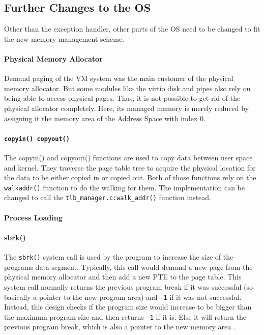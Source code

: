 \subsection{Further Changes to the OS}
Other than the exception handler, other parts of the OS need to be changed to fit the new memory management scheme.

\paragraph{Physical Memory Allocator} %
Demand paging of the VM system was the main customer of the physical memory allocator.
But some modules like the virtio disk and pipes also rely on being able to access physical pages. Thus, it is not
possible to get rid of the physical allocator completely.
Here, its managed memory is merely reduced by assigning it the memory area of the Address Space with index 0.

\paragraph{\texttt{copyin() copyout()}} The copyin() and copyout() functions are used to copy data between
user space and kernel. They traverse the page table tree to acquire the physical location for the data
to be either copied in or copied out.
Both of those functions rely on the \texttt{walkaddr()} function to do the walking for them.
The implementation can be changed to call the \texttt{tlb\_manager.c:walk\_addr()} function instead.

\paragraph{Process Loading} %
\paragraph{sbrk()}The \texttt{sbrk()} system call is used by the program to increase the size
of the programs data segment. Typically, this call would demand a new page from the physical memory allocator
and then add a new PTE to the page table.
This system call normally returns the previous program break if it was successful (so basically a pointer to
the new program area) and \texttt{-1} if it was not successful.
Instead, this design checks if the program size would increase to be bigger than the maximum program size and
then returns \texttt{-1} if it is. Else it will return the previous program break, which is also a pointer to the new memory area \cite{rochkind2004advanced}.


